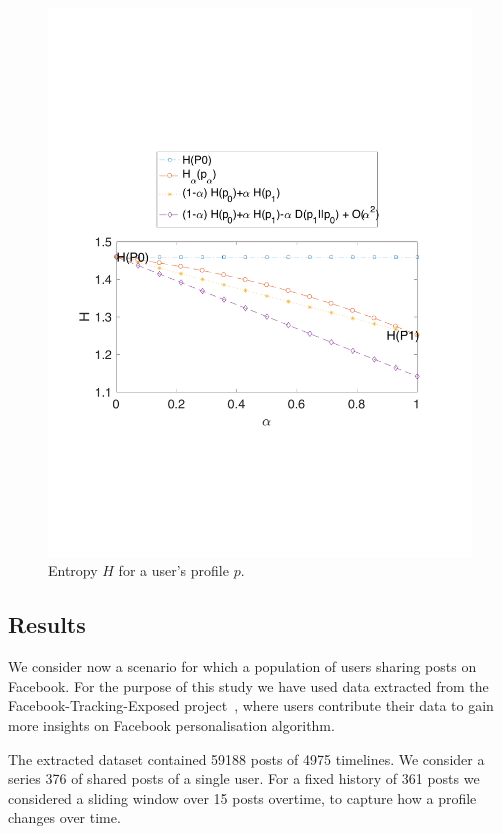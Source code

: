\begin{figure}[htb]
\centering
\includegraphics[scale=0.5]{figures/example_1_H.pdf}
\caption{Entropy $H$ for a user's profile $p$.}
\label{fig:6}
\end{figure}

\subsection{Results}

We consider now a scenario for which a population of users sharing posts on Facebook. For the purpose of this study we have used data extracted from the Facebook-Tracking-Exposed project~\cite{FTE}, where users contribute their data to gain more insights on Facebook personalisation algorithm.

The extracted dataset contained 59188 posts of 4975 timelines. We consider a series 376 of shared posts of a single user. For a fixed history of 361 posts we considered a sliding window over 15 posts overtime, to capture how a profile changes over time.

